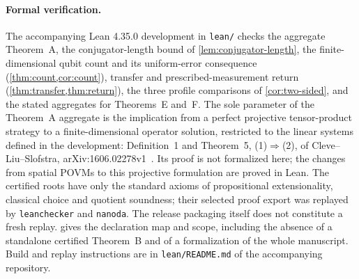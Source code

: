 \paragraph{Formal verification.}
The accompanying Lean 4.35.0 development in \texttt{lean/} checks the aggregate
Theorem~A, the conjugator-length bound of \cref{lem:conjugator-length}, the
finite-dimensional qubit count and its uniform-error consequence
(\cref{thm:count,cor:count}), transfer and prescribed-measurement return
(\cref{thm:transfer,thm:return}), the three profile comparisons of
\cref{cor:two-sided}, and the stated aggregates for Theorems~E and~F.
The sole parameter of the Theorem~A aggregate is the implication from a perfect
projective tensor-product strategy to a finite-dimensional operator solution,
restricted to the linear systems defined in the development: Definition~1 and
Theorem~5, (1)$\Rightarrow$(2), of Cleve--Liu--Slofstra,
arXiv:1606.02278v1~\cite{CLS17}. Its proof is not formalized here; the changes
from spatial POVMs to this projective formulation are proved in Lean.
The certified roots have only the standard axioms of propositional extensionality,
classical choice and quotient soundness; their selected proof export was replayed
by \texttt{leanchecker} and \texttt{nanoda}. The release packaging itself does not
constitute a fresh replay.  gives the declaration map and scope,
including the absence of a standalone certified Theorem~B and of a formalization
of the whole manuscript. Build and replay instructions are in
\texttt{lean/README.md} of the accompanying repository.
